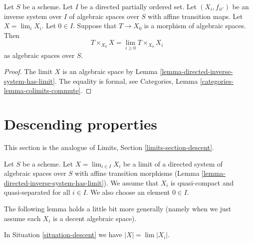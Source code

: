 \begin{lemma}
\label{lemma-space-over-limit}
Let $S$ be a scheme. Let $I$ be a directed partially ordered set.
Let $(X_i, f_{ii'})$ be an inverse system over $I$ of algebraic spaces
over $S$ with affine transition maps.
Let $X = \lim_i X_i$. Let $0 \in I$. Suppose that $T \to X_0$ is a
morphism of algebraic spaces. Then
$$
T \times_{X_0} X = \lim_{i \geq 0} T \times_{X_0} X_i
$$
as algebraic spaces over $S$.
\end{lemma}

\begin{proof}
The limit $X$ is an algebraic space by
Lemma \ref{lemma-directed-inverse-system-has-limit}.
The equality is formal, see
Categories, Lemma \ref{categories-lemma-colimits-commute}.
\end{proof}





\section{Descending properties}
\label{section-descent}

\noindent
This section is the analogue of Limits, Section \ref{limits-section-descent}.

\begin{situation}
\label{situation-descent}
Let $S$ be a scheme. Let $X = \lim_{i \in I} X_i$ be a limit of a directed
system of algebraic spaces over $S$ with affine transition morphisms
(Lemma \ref{lemma-directed-inverse-system-has-limit}).
We assume that $X_i$ is quasi-compact and quasi-separated for all $i \in I$.
We also choose an element $0 \in I$.
\end{situation}

\noindent
The following lemma holds a little bit more generally
(namely when we just assume each $X_i$ is a decent algebraic space).

\begin{lemma}
\label{lemma-topology-limit}
In Situation \ref{situation-descent} we have $|X| = \lim |X_i|$.
\end{lemma}

